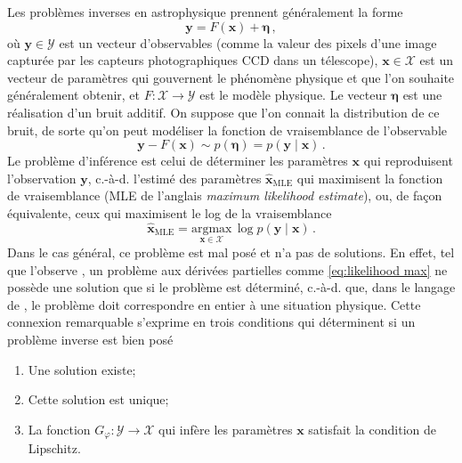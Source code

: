 Les problèmes inverses en astrophysique prennent généralement la forme
\begin{equation}\label{eq:inverse problem lineaire}
       \mathbf{y} = F(\mathbf{x}) + \boldsymbol{\eta}\, ,
\end{equation} 
où $\mathbf{y}\in \mathcal{Y}$ est un vecteur d'observables (comme la valeur des pixels d'une image capturée par les capteurs photographiques CCD dans un télescope), 
$\mathbf{x}\in\mathcal{X}$ est un vecteur de paramètres qui gouvernent le phénomène physique
et que l'on souhaite généralement obtenir, et $F:\mathcal{X} \rightarrow \mathcal{Y}$ est le modèle physique.
Le vecteur $\boldsymbol{\eta}$ est une réalisation d'un bruit additif. 
On suppose que l’on connait la distribution de ce bruit, de sorte qu'on peut modéliser la fonction de vraisemblance de l'observable
\begin{equation}\label{eq:likelihood intro}
        \mathbf{y} - F(\mathbf{x}) \sim p(\boldsymbol{ \eta}) = p(\mathbf{y} \mid \mathbf{x})\, .
\end{equation} 
Le problème d'inférence est celui de déterminer les paramètres $\mathbf{x}$ qui reproduisent l'observation $\mathbf{y}$, 
c.-à-d. l'estimé des paramètres $\hat{\mathbf{x}}_{\mathrm{MLE}}$ 
qui maximisent la fonction de vraisemblance (MLE de l'anglais \textit{maximum likelihood estimate}), 
ou, de façon équivalente, ceux qui maximisent le log de la vraisemblance
\begin{equation}\label{eq:likelihood max}
        \hat{\mathbf{x}}_{\mathrm{MLE}} = \underset{\mathbf{x} \in \mathcal{X}}{\mathrm{argmax}}\, \log p(\mathbf{y} \mid \mathbf{x})\, .
\end{equation} 
Dans le cas général, ce problème est mal posé et n'a pas de solutions. En effet, 
tel que l'observe \citet{Hadamard1902}, un problème aux dérivées partielles comme \eqref{eq:likelihood max} 
ne possède une solution que si le problème est déterminé, c.-à-d. que, dans le langage de \citet{Hadamard1902}, 
le problème doit correspondre en entier à une situation physique. Cette connexion remarquable s'exprime en trois conditions qui déterminent 
si un problème inverse est bien posé
\begin{enumerate}[label=(\subscript{H}{{\arabic*}})]
        \item \label{hadamard:1}Une solution existe;
        \item \label{hadamard:2}Cette solution est unique;
        \item \label{hadamard:3} La fonction $G_\varphi: \mathcal{Y} \rightarrow \mathcal{X}$ 
                qui infère les paramètres $\mathbf{x}$ satisfait la condition de Lipschitz.
\end{enumerate}
